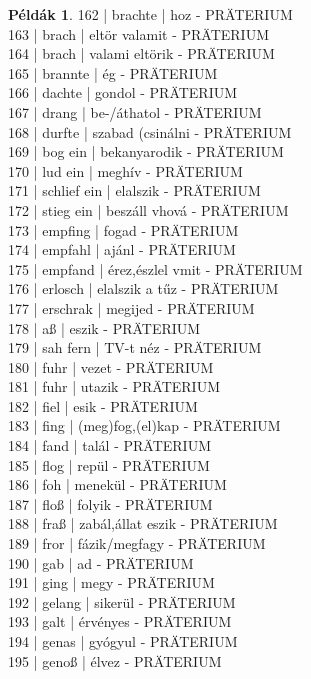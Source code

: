 \documentclass{article}
\theoremstyle{definition}
\newtheorem*{exmp}{Példák}
\begin{document}
\begin{exmp}
162 | brachte | hoz - PRÄTERIUM\\
163 | brach | eltör valamit - PRÄTERIUM\\
164 | brach | valami eltörik - PRÄTERIUM\\
165 | brannte | ég - PRÄTERIUM\\
166 | dachte | gondol - PRÄTERIUM\\
167 | drang | be-/áthatol - PRÄTERIUM\\
168 | durfte | szabad (csinálni - PRÄTERIUM\\
169 | bog ein | bekanyarodik - PRÄTERIUM\\
170 | lud ein | meghív - PRÄTERIUM\\
171 | schlief ein | elalszik - PRÄTERIUM\\
172 | stieg ein | beszáll vhová - PRÄTERIUM\\
173 | empfing | fogad - PRÄTERIUM\\
174 | empfahl | ajánl - PRÄTERIUM\\
175 | empfand | érez,észlel vmit - PRÄTERIUM\\
176 | erlosch | elalszik a tűz - PRÄTERIUM\\
177 | erschrak | megijed - PRÄTERIUM\\
178 | aß | eszik - PRÄTERIUM\\
179 | sah fern | TV-t néz - PRÄTERIUM\\
180 | fuhr | vezet - PRÄTERIUM\\
181 | fuhr  | utazik - PRÄTERIUM\\
182 | fiel | esik - PRÄTERIUM\\
183 | fing | (meg)fog,(el)kap - PRÄTERIUM\\
184 | fand | talál - PRÄTERIUM\\
185 | flog | repül - PRÄTERIUM\\
186 | foh | menekül - PRÄTERIUM\\
187 | floß | folyik - PRÄTERIUM\\
188 | fraß | zabál,állat eszik - PRÄTERIUM\\
189 | fror | fázik/megfagy - PRÄTERIUM\\
190 | gab | ad - PRÄTERIUM\\
191 | ging  | megy - PRÄTERIUM\\
192 | gelang | sikerül - PRÄTERIUM\\
193 | galt | érvényes - PRÄTERIUM\\
194 | genas | gyógyul - PRÄTERIUM\\
195 | genoß | élvez - PRÄTERIUM\\

\end{exmp}
\end{document}
